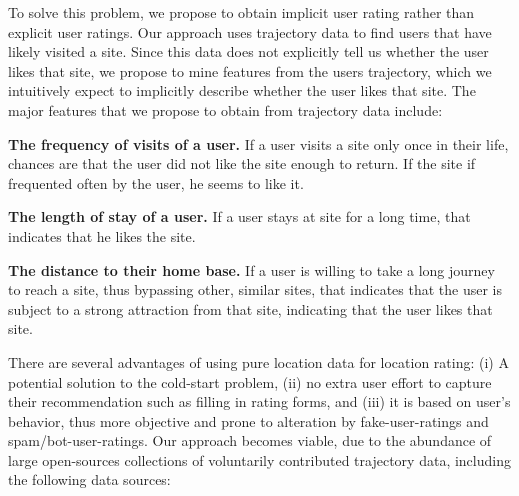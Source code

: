 To solve this problem, we propose to obtain implicit user rating rather than explicit user ratings. Our approach uses trajectory data to find users that have likely visited a site. 
Since this data does not explicitly tell us whether the user likes that site, we propose to mine features from the users trajectory, which we intuitively expect to implicitly describe whether the user likes that site. The major features that we propose to obtain from trajectory data include:
\begin{compactitem}
\item {\bf The frequency of visits of a user.} If a user visits a site only once in their life, chances are that the user did not like the site enough to return. If the site if frequented often by the user, he seems to like it.
\item {\bf The length of stay of a user.} If a user stays at site for a long time, that indicates that he likes the site.
\item {\bf The distance to their home base.} If a user is willing to take a long journey to reach a site, thus bypassing other, similar sites, that indicates that the user is subject to a strong attraction from that site, indicating that the user likes that site.
\end{compactitem}
There are several advantages of using pure location data for location rating: (i) A potential solution to the cold-start problem, (ii) no extra user effort to capture their recommendation such as filling in rating forms, and (iii) it is based on user's behavior, thus more objective and prone to alteration by fake-user-ratings and spam/bot-user-ratings.
%
Our approach becomes viable, due to the abundance of large open-sources collections of voluntarily contributed trajectory data, including the following data sources:

